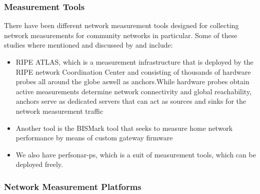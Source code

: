 \subsubsection{Measurement Tools}\label{null:measurement-tools}
There have been different network measurement tools designed for collecting network measurements for community networks in particular.
Some of these studies where mentioned and discussed by\cite{Braem:2015:AEQ:2830629.2830639} and include:
\begin{itemize}
    \item RIPE ATLAS, which is a measurement infrastructure that is deployed by the RIPE network Coordination Center and consisting of thousands of hardware probes all around the globe aswell as anchors\cite{7076582, Bajpai:2015:LLU:2805789.2805796}.While hardware probes obtain active measurements determine network connectivity and global reachability, anchors serve as dedicated servers that can act as sources and sinks for the network measurement traffic\cite{Bajpai:2015:LLU:2805789.2805796}
    \item Another tool is the BISMark tool that seeks to measure home network performance by means of custom gateway firmware\cite{Braem:2015:AEQ:2830629.2830639}
    \item We also have perfsonar-ps, which is a suit of measurement tools, which can be deployed freely\cite{Braem:2015:AEQ:2830629.2830639}.
\end{itemize}
\subsubsection{Network Measurement Platforms}\label{null:network-measurement-platforms}
